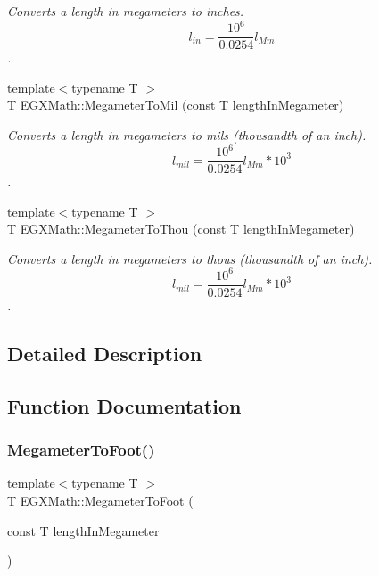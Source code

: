 \begin{DoxyCompactItemize}
\begin{DoxyCompactList}\small\item\em Converts a length in megameters to inches. \[ l_{in}= \frac{10^{6}}{0.0254} l_{Mm} \]. \end{DoxyCompactList}\item 
{\footnotesize template$<$typename T $>$ }\\T \mbox{\hyperlink{group___e_g_x_math-_conversions-_length_conversions-_megameter-_imperial_ga9494edd6659b7f69549d4fe96b9e2f98}{E\+G\+X\+Math\+::\+Megameter\+To\+Mil}} (const T length\+In\+Megameter)
\begin{DoxyCompactList}\small\item\em Converts a length in megameters to mils (thousandth of an inch). \[ l_{mil}= \frac{10^{6}}{0.0254} l_{Mm} * 10^{3} \]. \end{DoxyCompactList}\item 
{\footnotesize template$<$typename T $>$ }\\T \mbox{\hyperlink{group___e_g_x_math-_conversions-_length_conversions-_megameter-_imperial_gae791a30b052a322fff88090e90fe32b5}{E\+G\+X\+Math\+::\+Megameter\+To\+Thou}} (const T length\+In\+Megameter)
\begin{DoxyCompactList}\small\item\em Converts a length in megameters to thous (thousandth of an inch). \[ l_{mil}= \frac{10^{6}}{0.0254} l_{Mm} * 10^{3} \]. \end{DoxyCompactList}\end{DoxyCompactItemize}


\subsection{Detailed Description}


\subsection{Function Documentation}
\mbox{\label{group___e_g_x_math-_conversions-_length_conversions-_megameter-_imperial_ga5586abd81d8635465b9be7f9be5fadc7}} 
\subsubsection{\texorpdfstring{Megameter\+To\+Foot()}{MegameterToFoot()}}
{\footnotesize\ttfamily template$<$typename T $>$ \\
T E\+G\+X\+Math\+::\+Megameter\+To\+Foot (\begin{DoxyParamCaption}\item[{const T}]{length\+In\+Megameter }\end{DoxyParamCaption})}



